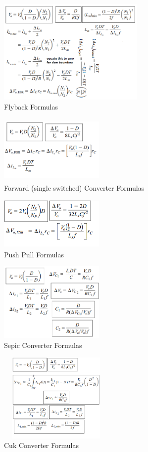 \documentclass[twocolumn, ]{article}
\begin{document}
\begin{figure}[!ht]
	\includegraphics[width=2.8in,height=2in]{flybackformulasfromhart.png}
	\caption{Flyback Formulas}
\end{figure}
\begin{figure}[!ht]
	\includegraphics[width=2in,height=1.3in]{forwardsingleswitch.png}
	\caption{Forward (single switched) Converter Formulas}
\end{figure}
\begin{figure}[!ht]
	\includegraphics[width=2in,height=1in]{pushpull_someformulas.png}
	\caption{Push Pull Formulas}
\end{figure}
\begin{figure}[!ht]
	\includegraphics[width=2in,height=1.5in]{sepicformulas.png}
	\caption{Sepic Converter Formulas}
\end{figure}
\begin{figure}[!ht]
	\includegraphics[width=2.2in,height=1.7in]{cukformulas.png}
	\caption{Cuk Converter Formulas}
\end{figure}
\end{document}
